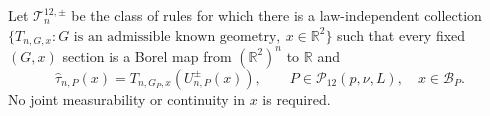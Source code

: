 Let \(\mathcal T^{12,\pm}_n\) be the class of rules for which there is a law-independent collection \(\{T_{n,G,x}:G\text{ is an admissible known geometry},\ x\in\mathbb R^2\}\) such that every fixed \((G,x)\) section is a Borel map from \((\mathbb R^2)^n\) to \(\mathbb R\) and
\[
 \widehat\tau_{n,P}(x)=T_{n,G_P,x}(U^{\pm}_{n,P}(x)),
 \qquad P\in\mathcal P_{12}(p,\nu,L),\quad x\in\mathcal B_P.
\]
No joint measurability or continuity in \(x\) is required.